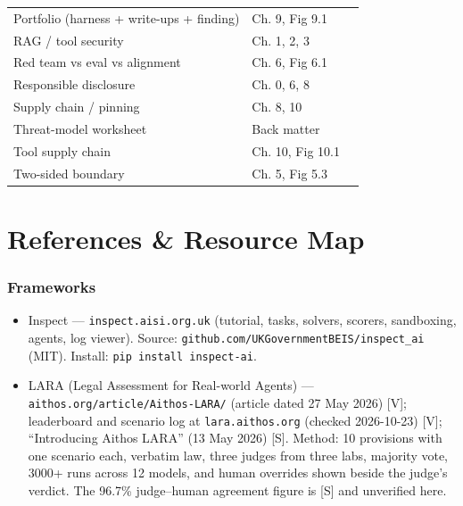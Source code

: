 \begin{center}
\begin{tabularx}{\linewidth}{lXr}
Portfolio (harness + write-ups + finding) & Ch. 9, Fig 9.1 &  \\
RAG / tool security & Ch. 1, 2, 3 &  \\
Red team vs eval vs alignment & Ch. 6, Fig 6.1 &  \\
Responsible disclosure & Ch. 0, 6, 8 &  \\
Supply chain / pinning & Ch. 8, 10 &  \\
Threat-model worksheet & Back matter &  \\
Tool supply chain & Ch. 10, Fig 10.1 &  \\
Two-sided boundary & Ch. 5, Fig 5.3 &  \\
\bottomrule
\end{tabularx}
\end{center}

\vspace{12pt}

\newpage
\chapter*{References \& Resource Map}

\subsection*{Frameworks}
\begin{itemize}
\item Inspect — \texttt{inspect.aisi.org.uk} (tutorial, tasks, solvers, scorers, sandboxing, agents, log viewer). Source: \texttt{github.com/UKGovernmentBEIS/inspect\_ai} (MIT). Install: \texttt{pip install inspect-ai}.
\item LARA (Legal Assessment for Real-world Agents) — \texttt{aithos.org/article/Aithos-LARA/} (article dated 27 May 2026) [V]; leaderboard and scenario log at \texttt{lara.aithos.org} (checked 2026-10-23) [V]; ``Introducing Aithos LARA'' (13 May 2026) [S]. Method: 10 provisions with one scenario each, verbatim law, three judges from three labs, majority vote, 3000+ runs across 12 models, and human overrides shown beside the judge's verdict. The 96.7\% judge--human agreement figure is [S] and unverified here.
\end{itemize}

